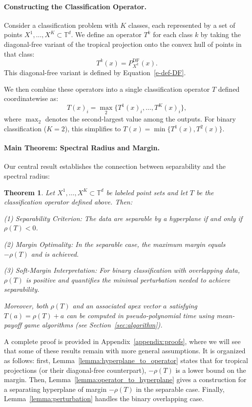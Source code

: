 \documentclass{article}
\newtheorem{theorem}{Theorem}
\newcommand{\trop}{\mathbb{T}}
\begin{document}
\paragraph{Constructing the Classification Operator.}
Consider a classification problem with $K$ classes, each represented by a set of points $X^1,\dots,X^K \subset \trop^d$. We define an operator $T^k$ for each class $k$ by taking the diagonal-free variant of the tropical projection onto the convex hull of points in that class:
\[
T^k(x) = P_{X^k}^{\text{DF}}(x).
\]
This diagonal-free variant is defined by Equation~\ref{e-def-DF}.

We then combine these operators into a single classification operator $T$ defined coordinatewise as:
\[
T(x)_i = \operatorname{\max}_2\{T^1(x)_i, \dots, T^K(x)_i\}\label{eq:single_operator},
\]
where $\operatorname{\max}_2$ denotes the second-largest value among the outputs. For binary classification ($K=2$), this simplifies to $T(x)=\min\{T^1(x), T^2(x)\}$.

\paragraph{Main Theorem: Spectral Radius and Margin.}
Our central result establishes the connection between separability and the spectral radius:
\begin{theorem}\label{thm:spectral_separability}
Let $X^1,\ldots,X^K \subset \trop^d$ be labeled point sets and let $T$ be the classification operator defined above. Then:

(1) \textit{Separability Criterion:} The data are separable by a hyperplane if and only if $\rho(T) < 0$.

(2) \textit{Margin Optimality:} In the separable case, the maximum margin equals $-\rho(T)$ and is achieved.

(3) \textit{Soft-Margin Interpretation:} For binary classification with overlapping data, $\rho(T)$ is positive and quantifies the minimal perturbation needed to achieve separability.

Moreover, both $\rho(T)$ and an associated apex vector $a$ satisfying $T(a) = \rho(T)+a$ can be computed in pseudo-polynomial time using mean-payoff game algorithms (see Section~\ref{sec:algorithm}).
\end{theorem}
A complete proof is provided in Appendix~\ref{appendix:proofs}, where we will see that some of these results remain with more general assumptions.
It is organized as follows: first, Lemma~\ref{lemma:hyperplane_to_operator} states that for tropical projections (or their diagonal-free counterpart), $-\rho(T)$ is a lower bound on the margin.
Then, Lemma~\ref{lemma:operator_to_hyperplane} gives a construction for a separating hyperplane of margin $-\rho(T)$ in the separable case. Finally, Lemma~\ref{lemma:perturbation} handles the binary overlapping case.
\end{document}
